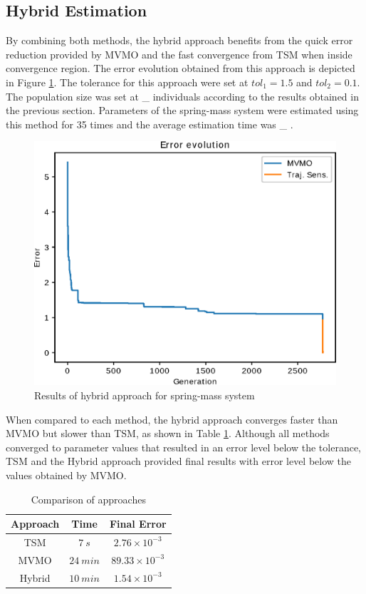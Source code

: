 \subsection{Hybrid Estimation}

By combining both methods, the hybrid approach benefits from the quick error reduction provided by MVMO and the fast convergence from TSM when inside convergence region. The error evolution obtained from this approach is depicted in Figure \ref{fig: Hybrid_conv}. The tolerance for this approach were set at $tol_{1} = 1.5$ and $tol_{2} = 0.1$. The population size was set at \_ individuals according to the results obtained in the previous section. Parameters of the spring-mass system were estimated using this method for 35 times and the average estimation time was \_ .

\begin{figure}[h]
	\caption{Results of hybrid approach for spring-mass system}
	\begin{center}
		\includegraphics[scale=0.7]{Images/Hybrid_conv.eps}
	\end{center}
	\label{fig: Hybrid_conv}
\end{figure}

When compared to each method, the hybrid approach converges faster than MVMO but slower than TSM, as shown in Table \ref{tab: SM}. Although all methods converged to parameter values that resulted in an error level below the tolerance, TSM and the Hybrid approach provided final results with error level below the values obtained by MVMO.

\begin{table}[h]
	\caption{Comparison of approaches}
	\begin{center}
	\begin{tabular}{c|c|c}
		Approach & Time & Final Error \\
		\hline
		TSM  & $7 \ s$  & $2.76\times 10^{-3}$ \\
		MVMO  & $24 \ min$  & $89.33\times 10^{-3}$\\
		Hybrid  & $10 \ min$  & $1.54\times 10^{-3}$
	\end{tabular}
	\end{center}
	\label{tab: SM}
\end{table}
